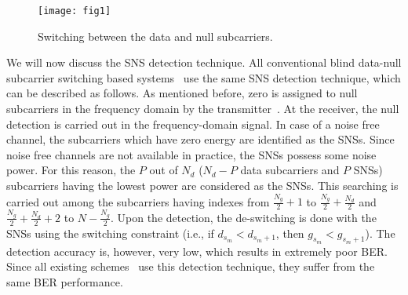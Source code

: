 \documentclass[journal,comsoc]{IEEEtran}
\begin{document}
\begin{figure}[t]
\centering
\texttt{[image: fig1]}
\caption{Switching between the data and null subcarriers.}
\label{fig:fig1}
\end{figure}


   We will now discuss the SNS detection technique. All conventional blind data-null subcarrier switching based systems~\cite{wong1,sabbir1,sabbir2,sabbir3} use the same SNS detection technique, which can be described as follows. As mentioned before, zero is assigned to null subcarriers in the frequency domain by the transmitter~\cite{Li}. At the receiver, the null detection is carried out in the frequency-domain signal.  In case of a noise free channel, the subcarriers which have zero energy are identified as the SNSs. Since noise free channels are not available in practice, the SNSs possess some noise power. For this reason, the $P$ out of $N_d$ ($N_d-P$ data subcarriers and $P$ SNSs) subcarriers having the lowest power are considered as the SNSs. This searching is carried out among the subcarriers having indexes from $\frac{N_g}{2}+1$ to $\frac{N_g}{2}+\frac{N_d}{2}$ and $\frac{N_g}{2}+\frac{N_d}{2}+2$ to $N-\frac{N_g}{2}$. Upon the detection, the de-switching is done with the SNSs using the switching constraint (i.e., if $d_{s_m}<d_{s_m+1}$, then $g_{s_m}<g_{s_m+1}$). The detection accuracy is, however, very low, which results in extremely poor BER. Since all existing schemes~\cite{wong1,sabbir1,sabbir2,sabbir3} use this detection technique, they suffer from the same BER performance.
   
\end{document}
